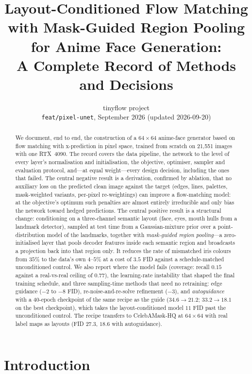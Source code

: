 \documentclass[11pt]{article}
\title{\textbf{Layout-Conditioned Flow Matching with Mask-Guided Region Pooling\\for Anime Face Generation:\\A Complete Record of Methods and Decisions}}
\author{tinyflow project \\ \texttt{feat/pixel-unet}, September 2026 (updated 2026-09-20)}
\date{}
\begin{document}
\maketitle

\begin{abstract}
We document, end to end, the construction of a $64\times64$ anime-face generator based on
flow matching with x-prediction in pixel space, trained from scratch on 21{,}551 images
with one RTX~4090. The record covers the data pipeline, the network to the level of
every layer's normalisation and initialisation, the objective, optimiser, sampler and
evaluation protocol, and---at equal weight---every design decision, including the ones
that failed. The central negative result is a derivation, confirmed by ablation, that
no auxiliary loss on the predicted clean image against the target (edges, lines,
palettes, mask-weighted variants, per-pixel re-weightings) can improve a flow-matching
model: at the objective's optimum such penalties are almost entirely irreducible and
only bias the network toward hedged predictions. The central positive result is a
structural change: conditioning on a three-channel semantic layout (face, eyes, mouth
hulls from a landmark detector), sampled at test time from a Gaussian-mixture prior over
a point-distribution model of the landmarks, together with \emph{mask-guided region
pooling}---a zero-initialised layer that pools decoder features inside each semantic
region and broadcasts a projection back into that region only. It reduces the rate of
mismatched iris colours from $35\%$ to the data's own $4$--$5\%$ at a cost of $3.5$ FID
against a schedule-matched unconditioned control. We also report where the model fails
(coverage: recall $0.15$ against a real-vs-real ceiling of $0.77$), the learning-rate
instability that shaped the final training schedule, and three sampling-time methods
that need no retraining: edge guidance ($-2$ to $-8$ FID), re-noise-and-re-solve
refinement ($-3$), and \emph{autoguidance} with a 40-epoch checkpoint of the same
recipe as the guide ($34.6\to21.2$; $33.2\to18.1$ on the best checkpoint), which
takes the layout-conditioned model $11$ FID past the unconditioned control. The
recipe transfers to CelebAMask-HQ at $64\times64$ with real label maps as layouts
(FID $27.3$, $18.6$ with autoguidance).
\end{abstract}

\section{Introduction}
\end{document}
